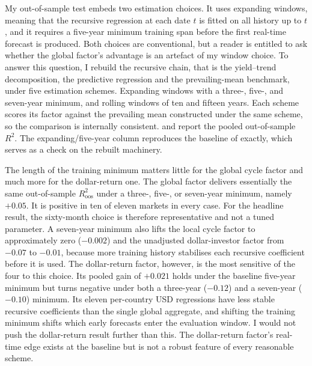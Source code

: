 My out-of-sample test embeds two estimation choices. It uses
expanding windows, meaning that the recursive regression at each date $t$
is fitted on all history up to $t$, and it requires a five-year minimum training span before the first real-time forecast is produced. Both
choices are conventional, but a reader is entitled to
ask whether the global factor's advantage is an artefact of my window choice. To answer
this question, I rebuild the recursive chain, that is the yield--trend
decomposition, the predictive regression and the prevailing-mean benchmark,
under five estimation schemes. Expanding windows with a three-,
five-, and seven-year minimum, and rolling windows of ten and fifteen years.
Each scheme scores its factor against the prevailing mean constructed under the
same scheme, so the comparison is internally consistent.
 and  report the
pooled out-of-sample $R^{2}$. The expanding/five-year column reproduces the
baseline of  exactly, which serves as a check on the
rebuilt machinery.

The length of the training minimum matters little for the global cycle factor
and much more for the dollar-return one. The global factor delivers essentially
the same out-of-sample $R^{2}_{\mathrm{oos}}$ under a three-, five-, or
seven-year minimum, namely $+0.05$. It
is positive in ten of eleven markets in every case. For the headline result,
the sixty-month choice is therefore representative and not a tuned
parameter. A seven-year minimum also lifts the local cycle factor to
approximately zero ($-0.002$) and the unadjusted dollar-investor factor from
$-0.07$ to $-0.01$, because more training history stabilises each recursive
coefficient before it is used. The dollar-return factor, however, is the most
sensitive of the four to this choice. Its pooled gain of $+0.021$ holds under
the baseline five-year minimum but turns negative under both a three-year
($-0.12$) and a seven-year ($-0.10$) minimum. Its eleven per-country USD
regressions have less stable recursive coefficients than the single global
aggregate, and shifting the training minimum shifts which early forecasts
enter the evaluation window. I would not push the dollar-return result further than this. The dollar-return
factor's real-time edge exists at the baseline but is not a robust feature of
every reasonable scheme.

